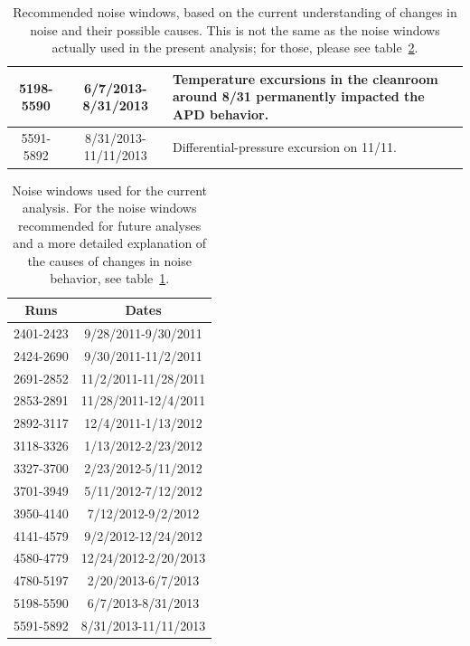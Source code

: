 \begin{table}
\begin{singlespace}
\begin{center}
\begin{tabular}{|c|c|p{}|}
5198-5590 & 6/7/2013-8/31/2013 & Temperature excursions in the cleanroom around 8/31 permanently impacted the APD behavior. \\\hline
5591-5892 & 8/31/2013-11/11/2013 & Differential-pressure excursion on 11/11. \\\hline
\end{tabular}
\end{center}
\end{singlespace}
\caption{Recommended noise windows, based on the current understanding of changes in noise and their possible causes.  This is not the same as the noise windows actually used in the present analysis; for those, please see table~\ref{tab:NoiseWindowsUsedThisAnalysis}.}
\label{tab:NoiseWindowsRecommendedForFuture}
\end{table}

\begin{table}
\begin{singlespace}
\begin{center}
\begin{tabular}{|c|c|}\hline
Runs & Dates \\\hline
2401-2423 & 9/28/2011-9/30/2011 \\\hline
2424-2690 & 9/30/2011-11/2/2011 \\\hline
2691-2852 & 11/2/2011-11/28/2011 \\\hline
2853-2891 & 11/28/2011-12/4/2011 \\\hline
2892-3117 & 12/4/2011-1/13/2012 \\\hline
3118-3326 & 1/13/2012-2/23/2012 \\\hline
3327-3700 & 2/23/2012-5/11/2012 \\\hline
3701-3949 & 5/11/2012-7/12/2012 \\\hline
3950-4140 & 7/12/2012-9/2/2012 \\\hline
4141-4579 & 9/2/2012-12/24/2012 \\\hline
4580-4779 & 12/24/2012-2/20/2013 \\\hline
4780-5197 & 2/20/2013-6/7/2013 \\\hline
5198-5590 & 6/7/2013-8/31/2013 \\\hline
5591-5892 & 8/31/2013-11/11/2013 \\\hline
\end{tabular}
\end{center}
\end{singlespace}
\caption{Noise windows used for the current analysis.  For the noise windows recommended for future analyses and a more detailed explanation of the causes of changes in noise behavior, see table~\ref{tab:NoiseWindowsRecommendedForFuture}.}
\label{tab:NoiseWindowsUsedThisAnalysis}
\end{table}

